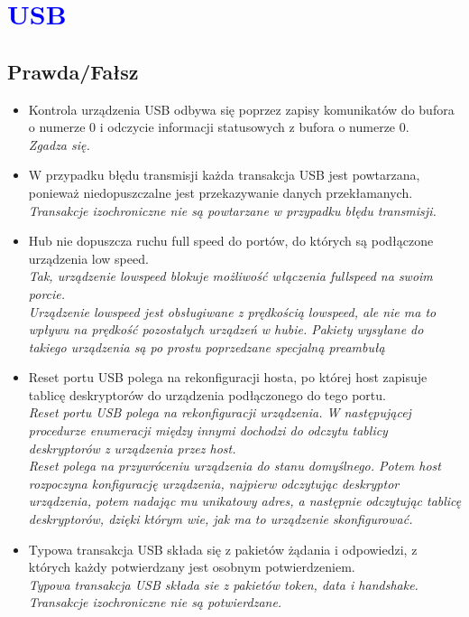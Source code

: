 \section{\textcolor{blue}{USB}}
\subsection*{Prawda/Fałsz}
\begin{itemize}
	
	\item \textcolor{tak}{Kontrola urządzenia USB odbywa się poprzez zapisy komunikatów do bufora o numerze 0 i odczycie informacji statusowych z bufora o numerze 0.} \\
	{\small \emph{Zgadza się.}}
	
	\item \textcolor{nie}{W przypadku błędu transmisji każda transakcja USB jest powtarzana, ponieważ niedopuszczalne jest przekazywanie danych przekłamanych.} \\
	{\small \emph{Transakcje izochroniczne nie są powtarzane w przypadku błędu transmisji.}}
	
	\item \textcolor{tak}{Hub nie dopuszcza ruchu full speed do portów, do których są podłączone urządzenia low speed.} \\
	{\small \emph{Tak, urządzenie lowspeed blokuje możliwość włączenia fullspeed na swoim porcie.\\ Urządzenie lowspeed jest obsługiwane z prędkością lowspeed, ale nie ma to wpływu na prędkość pozostałych urządzeń w hubie. Pakiety wysyłane do takiego urządzenia są po prostu poprzedzane specjalną preambułą}}
	
	\item \textcolor{nie}{Reset portu USB polega na rekonfiguracji hosta, po której host zapisuje tablicę deskryptorów do urządzenia podłączonego do tego portu.} \\
	{\small \emph{Reset portu USB polega na rekonfiguracji urządzenia. W następującej procedurze enumeracji między innymi dochodzi do odczytu tablicy deskryptorów z urządzenia przez host.\\
	Reset polega na przywróceniu urządzenia do stanu domyślnego. Potem host rozpoczyna konfigurację urządzenia, najpierw odczytując deskryptor urządzenia, potem nadając mu unikatowy adres, a następnie odczytując tablicę deskryptorów, dzięki którym wie, jak ma to urządzenie skonfigurować.}}
	
	\item \textcolor{nie}{Typowa transakcja USB składa się z pakietów żądania i odpowiedzi, z których każdy potwierdzany jest osobnym potwierdzeniem.} \\
	{\small \emph{Typowa transakcja USB składa sie z pakietów token, data i handshake. Transakcje izochroniczne nie są potwierdzane.}}
	

\end{itemize}
